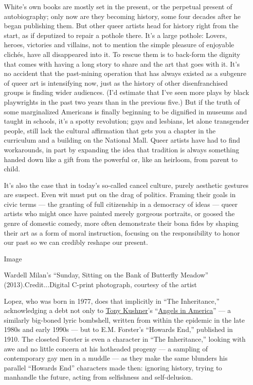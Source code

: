 White's own books are mostly set in the present, or the perpetual
present of autobiography; only now are they becoming history, some four
decades after he began publishing them. But other queer artists head for
history right from the start, as if deputized to repair a pothole there.
It's a large pothole: Lovers, heroes, victories and villains, not to
mention the simple pleasure of enjoyable clichés, have all disappeared
into it. To rescue them is to back-form the dignity that comes with
having a long story to share and the art that goes with it. It's no
accident that the past-mining operation that has always existed as a
subgenre of queer art is intensifying now, just as the history of other
disenfranchised groups is finding wider audiences. (I'd estimate that
I've seen more plays by black playwrights in the past two years than in
the previous five.) But if the truth of some marginalized Americans is
finally beginning to be dignified in museums and taught in schools, it's
a spotty revolution; gays and lesbians, let alone transgender people,
still lack the cultural affirmation that gets you a chapter in the
curriculum and a building on the National Mall. Queer artists have had
to find workarounds, in part by expanding the idea that tradition is
always something handed down like a gift from the powerful or, like an
heirloom, from parent to child.

It's also the case that in today's so-called cancel culture, purely
aesthetic gestures are suspect. Even wit must put on the drag of
politics. Framing their goals in civic terms --- the granting of full
citizenship in a democracy of ideas --- queer artists who might once
have painted merely gorgeous portraits, or goosed the genre of domestic
comedy, more often demonstrate their bona fides by shaping their art as
a form of moral instruction, focusing on the responsibility to honor our
past so we can credibly reshape our present.

Image

Wardell Milan's ``Sunday, Sitting on the Bank of Butterfly Meadow''
(2013).Credit...Digital C-print photograph, courtesy of the artist

Lopez, who was born in 1977, does that implicitly in ``The
Inheritance,'' acknowledging a debt not only to
\href{https://www.nytimes3xbfgragh.onion/topic/person/tony-kushner}{Tony
Kushner}'s
``\href{https://www.nytimes3xbfgragh.onion/2018/03/07/theater/tony-kushner-angels-in-america-broadway.html}{Angels
in America}'' --- a similarly big-boned lyric bombshell, written from
within the epidemic in the late 1980s and early 1990s --- but to E.M.
Forster's ``Howards End,'' published in 1910. The closeted Forster is
even a character in ``The Inheritance,'' looking with awe and no little
concern at his hotheaded progeny --- a sampling of contemporary gay men
in a muddle --- as they make the same blunders his parallel ``Howards
End'' characters made then: ignoring history, trying to manhandle the
future, acting from selfishness and self-delusion.

